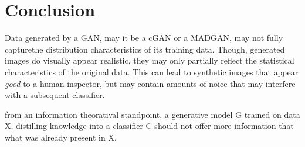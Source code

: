 \section{Conclusion}\label{conclusion}

Data generated by a GAN, may it be a cGAN or a MADGAN, may not fully capturethe distribution characteristics of its training data. Though, generated images do visually appear realistic, they may only partially reflect the statistical characteristics of the original data. This can lead to synthetic images that appear \textit{good} to a human inspector, but may contain amounts of noice that may interfere with a subsequent classifier.

from an information theoratival standpoint, a generative model G trained on data X, distilling knowledge into a classifier C should not offer more information that what was already present in X.
